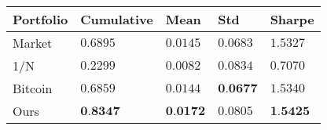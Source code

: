 \begin{tabularx}{\linewidth}{*{5}{X}}
\toprule
Portfolio & Cumulative & Mean & Std & Sharpe \\
\midrule
Market & $0.6895$ & $0.0145$ & $0.0683$ & $1.5327$\\
1/N & $0.2299$ & $0.0082$ & $0.0834$ & $0.7070$\\
Bitcoin & $0.6859$ & $0.0144$ & $\textbf{0.0677}$ & $1.5340$\\
Ours & $\textbf{0.8347}$ & $\textbf{0.0172}$ & $0.0805$ & $\textbf{1.5425}$\\
\bottomrule
\end{tabularx}
